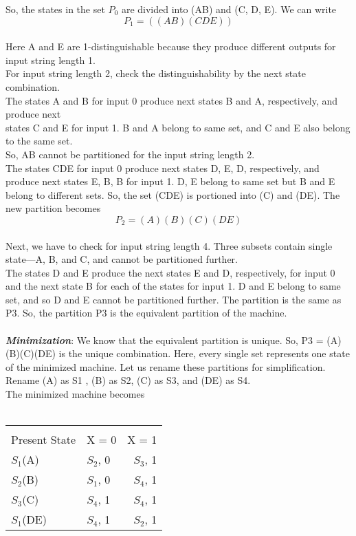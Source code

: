 \documentclass[12pt, a4paper]{article}
\begin{document}
\phantom{20} So, the states in the set $P_{0}$ are divided into (AB) and (C, D, E). We can write \[P_{1} = ((AB)(CDE))\] \\
\phantom{20} Here A and E are 1-distinguishable because they produce different outputs for input string length 1. \\
\phantom{20} For input string length 2, check the distinguishability by the next state combination. \\
\phantom{20} The states A and B for input 0 produce next states B and A, respectively, and produce next \\ 
states C and E for input 1. B and A belong to same set, and C and E also belong to the same set. \\
So, AB cannot be partitioned for the input string length 2. \\
\phantom{20} The states CDE for input 0 produce next states D, E, D, respectively, and produce next states E, B, B for input 1. D, E belong to same set but B and E belong to different sets. So, the set (CDE) is portioned into (C) and (DE). The new partition becomes \[P_{2} = (A)(B)(C)(DE)\] \\
\phantom{20} Next, we have to check for input string length 4. Three subsets contain single state—A, B, and C, and cannot be partitioned further. \\
\phantom{20}  The states D and E produce the next states E and D, respectively, for input 0 and the next state B for each of the states for input 1. D and E belong to same set, and so D and E cannot be partitioned further. The partition is the same as P3. So, the partition P3 is the equivalent partition of the machine. \\ \\
\textbf{\emph{Minimization}}: We know that the equivalent partition is unique. So, P3 = (A)(B)(C)(DE) is the unique combination. Here, every single set represents one state of the minimized machine.
\newpage
Let us rename these partitions for simplification. \\
\phantom{20}Rename (A) as S1 , (B) as S2, (C) as S3, and (DE) as S4. \\
\phantom{20}The minimized machine becomes \\ \\
\begin{center}
    \begin{tabular}{llr}  
    \toprule
    \multicolumn{3}{c}{}{Next State, z} \\
    \cmidrule(l){2-3}
    Present State    & X = 0 & X = 1 \\
    \midrule
    \phantom{20}$S_{1}$(A)      & $S_{2}$, 0    & $S_{3}$, 1      \\
    \phantom{20}$S_{2}$(B)      & $S_{1}$, 0    & $S_{4}$, 1      \\
    \phantom{20}$S_{3}$(C)      & $S_{4}$, 1    & $S_{4}$, 1      \\
    \phantom{20}$S_{1}$(DE)     & $S_{4}$, 1    & $S_{2}$, 1      \\
    \bottomrule
    \end{tabular}
\end{center}
\end{document}
